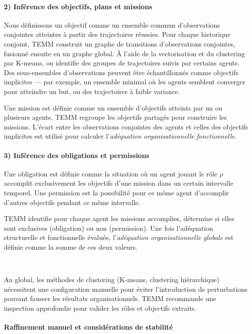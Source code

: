 \paragraph{2) Inférence des objectifs, plans et missions}

Nous définissons un objectif comme un ensemble commun d'observations conjointes atteintes à partir des trajectoires réussies.  
Pour chaque historique conjoint, TEMM construit un graphe de transitions d'observations conjointes, fusionné ensuite en un graphe global. À l'aide de la vectorisation et du clustering par K-means, on identifie des groupes de trajectoires suivis par certains agents. Des sous-ensembles d'observations peuvent être échantillonnés comme objectifs implicites — par exemple, un ensemble minimal où les agents semblent converger pour atteindre un but, ou des trajectoires à faible variance.

Une mission est définie comme un ensemble d'objectifs atteints par un ou plusieurs agents. TEMM regroupe les objectifs partagés pour construire les missions.  
L'écart entre les observations conjointes des agents et celles des objectifs implicites est utilisé pour calculer l'\textit{adéquation organisationnelle fonctionnelle}.

\paragraph{3) Inférence des obligations et permissions}

Une obligation est définie comme la situation où un agent jouant le rôle $\rho$ accomplit exclusivement les objectifs d'une mission dans un certain intervalle temporel. Une permission est la possibilité pour ce même agent d'accomplir d'autres objectifs pendant ce même intervalle.

TEMM identifie pour chaque agent les missions accomplies, détermine si elles sont exclusives (obligation) ou non (permission).  
Une fois l'adéquation structurelle et fonctionnelle évaluée, l'\textit{adéquation organisationnelle globale} est définie comme la somme de ces deux valeurs.

\

Au global, les méthodes de clustering (K-means, clustering hiérarchique) nécessitent une configuration manuelle pour éviter l'introduction de perturbations pouvant fausser les résultats organisationnels. TEMM recommande une inspection approfondie pour valider les rôles et objectifs extraits.

\paragraph{Raffinement manuel et considérations de stabilité}


